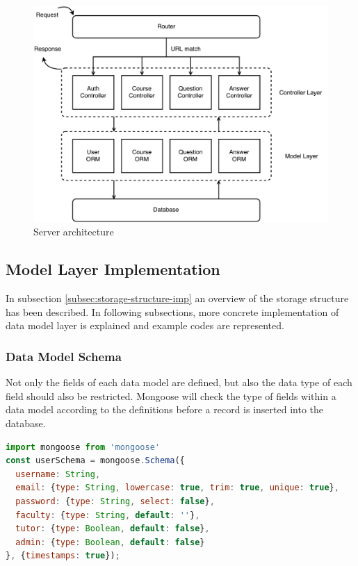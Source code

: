 \begin{figure}[!htbp]
  \centering
    \includegraphics[width=1\textwidth]{Figures/imp-server-arch.pdf}
  \caption{Server architecture}
  \label{fig:server-arch-imp}
\end{figure}




\subsection{Model Layer Implementation}
In subsection \ref{subsec:storage-structure-imp} an overview of the storage structure has been described. In following subsections, more concrete implementation of data model layer is explained and example codes are represented.

\subsubsection{Data Model Schema}

Not only the fields of each data model are defined, but also the data type of each field should also be restricted. Mongoose will check the type of fields within a data model according to the definitions before a record is inserted into the database. 

\begin{lstlisting}[language=JavaScript, caption=Example: user schema definition within Mongoose, label={list:user-schema-def-imp}]
import mongoose from 'mongoose'
const userSchema = mongoose.Schema({
  username: String,
  email: {type: String, lowercase: true, trim: true, unique: true},
  password: {type: String, select: false},
  faculty: {type: String, default: ''},
  tutor: {type: Boolean, default: false},
  admin: {type: Boolean, default: false}
}, {timestamps: true});
\end{lstlisting}

